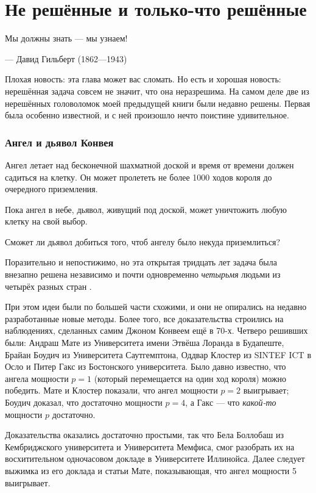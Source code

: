 \chapter{Не решённые и только-что решённые}


\setlength{\epigraphwidth}{.80\textwidth}
\epigraph{Мы должны знать --- мы узнаем!
}{--- Давид Гильберт (1862---1943)}

Плохая новость: эта глава может вас сломать.
Но есть и хорошая новость: нерешённая задача совсем не значит, что она неразрешима.
На самом деле две из нерешённых головоломок моей предыдущей книги были недавно решены.
Первая была особенно известной, и с ней произошло нечто поистине удивительное.

\subsection*{Ангел и дьявол Конвея}

Ангел летает над бесконечной шахматной доской и время от времени
должен садиться на клетку.
Он может пролететь не более 1000 ходов
короля до очередного приземления.

Пока ангел в небе, дьявол, живущий под доской, может уничтожить любую клетку на свой выбор.

Сможет ли дьявол добиться того, чтоб ангелу было некуда приземлиться?

\medskip

Поразительно и непостижимо, но эта открытая тридцать лет задача была внезапно решена
независимо и почти одновременно
\emph{четырьмя} людьми из четырёх разных стран \cite{10, 20, 40, 43}.

При этом идеи были по большей части схожими, и они не опирались на недавно разработанные новые методы.
Более того, все доказательства строились на наблюдениях, сделанных самим Джоном Конвеем ещё в 70-х.
Четверо решивших были:
Андраш Мате из Университета имени Этвёша Лоранда в Будапеште,
Брайан Боудич из Университета Саутгемптона,
Оддвар Клостер из SINTEF ICT в Осло
и Питер Гакс из Бостонского университета.
Было давно известно, что ангела мощности $p=1$ (который перемещается на один ход короля) можно победить.
Мате и Клостер показали, что ангел мощности $p=2$ выигрывает;
Боудич доказал, что достаточно мощности $p=4$,
а Гакс --- что \emph{какой-то} мощности $p$ достаточно.

Доказательства оказались достаточно простыми, так что Бела Боллобаш из Кембриджского университета и Университета Мемфиса, смог разобрать их на восхитительном одночасовом докладе в Университете Иллинойса.
Далее следует выжимка из его доклада и статьи Мате, показывающая, что ангел мощности 5 выигрывает.

